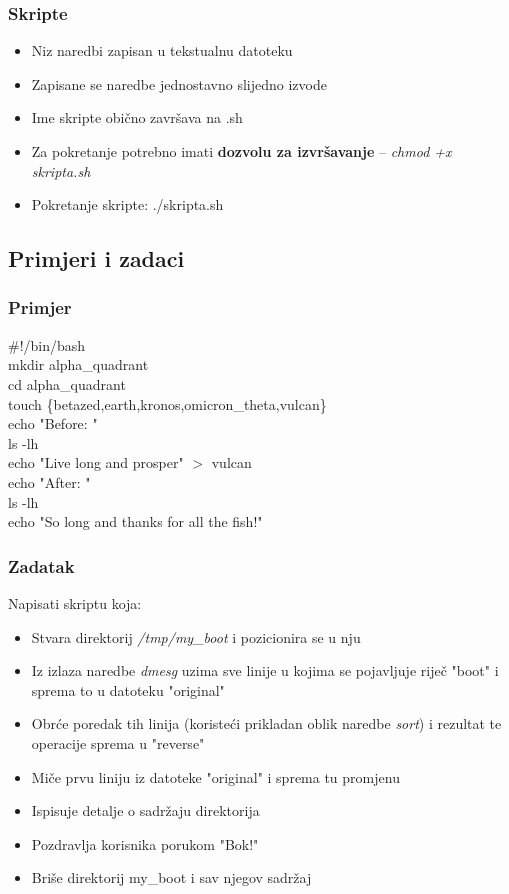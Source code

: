\documentclass{beamer}
\begin{document}
\begin{frame}[t]
\frametitle{Skripte}
  \begin{itemize}
    \setlength\itemsep{1em}
    \item Niz naredbi zapisan u tekstualnu datoteku
    \item Zapisane se naredbe jednostavno slijedno izvode
    \item Ime skripte obično završava na .sh
    \vfill
    \item Za pokretanje potrebno imati \textbf{dozvolu za izvršavanje} -- \textit{chmod +x skripta.sh}
    \item Pokretanje skripte: ./skripta.sh
  \end{itemize}
\end{frame}


\subsection{Primjeri i zadaci}
\begin{frame}[t]
\frametitle{Primjer}
  \#!/bin/bash \\ mkdir alpha\_quadrant \\ cd alpha\_quadrant \\ touch \{betazed,earth,kronos,omicron\_theta,vulcan\} \\ echo "Before: " \\ ls -lh \\ echo "Live long and prosper" $>$ vulcan \\ echo "After: " \\ ls -lh \\ echo "So long and thanks for all the fish!"
\end{frame}



\begin{frame}[t]
\frametitle{Zadatak}
  Napisati skriptu koja:
  \begin{itemize}
    \item Stvara direktorij \textit{/tmp/my\_boot} i pozicionira se u nju
    \item Iz izlaza naredbe \textit{dmesg} uzima sve linije u kojima se pojavljuje riječ "boot" i sprema to u datoteku "original"
    \item Obrće poredak tih linija (koristeći prikladan oblik naredbe \textit{sort}) i rezultat te operacije sprema u "reverse"
    \item Miče prvu liniju iz datoteke "original" i sprema tu promjenu
    \item Ispisuje detalje o sadržaju direktorija
    \item Pozdravlja korisnika porukom "Bok!"
    \item Briše direktorij my\_boot i sav njegov sadržaj
  \end{itemize}
\end{frame}
\end{document}
